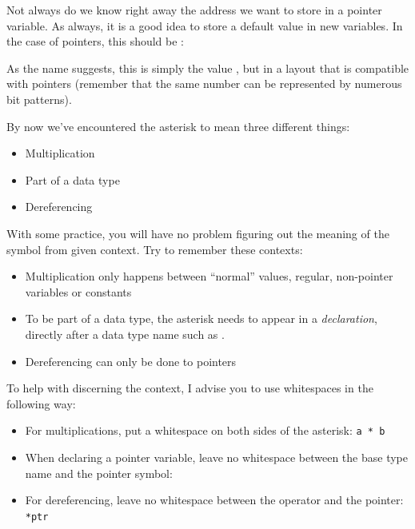 {{{{\begin{hintbox}
Not always do we know right away the address we want to store in a pointer variable. As always, it is a good idea to store a default value in new variables. In the case of pointers, this should be :
\vspace{3pt}

\vspace{-9pt}
As the name suggests, this is simply the value , but in a layout that is compatible with pointers (remember that the same number can be represented by numerous bit patterns).
\end{hintbox}

\begin{hintbox}
By now we've encountered the asterisk to mean three different things:
\begin{itemize}
\setlength\itemsep{0pt}
\item Multiplication
\item Part of a data type
\item Dereferencing
\end{itemize}

With some practice, you will have no problem figuring out the meaning of the symbol from given context. Try to remember these contexts:
\begin{itemize}
\setlength\itemsep{0pt}
\item Multiplication only happens between \enquote{normal} values, \ie regular, non-pointer variables or constants
\item To be part of a data type, the asterisk needs to appear in a \emph{declaration}, \ie directly after a data type name such as .
\item Dereferencing can only be done to pointers
\end{itemize}

To help with discerning the context, I advise you to use whitespaces in the following way:
\begin{itemize}
\setlength\itemsep{0pt}
\item For multiplications, put a whitespace on both sides of the asterisk: \texttt{a * b}
\item When declaring a pointer variable, leave no whitespace between the base type name and the pointer symbol: 
\item For dereferencing, leave no whitespace between the operator and the pointer: \texttt{*ptr}
\end{itemize}
\end{hintbox}

}}}}
